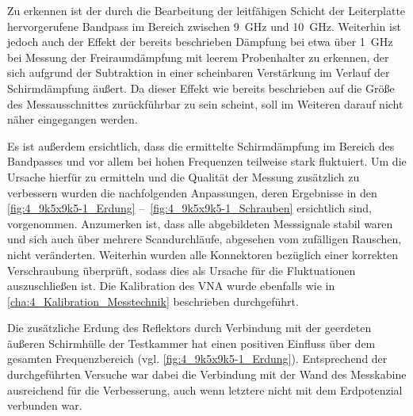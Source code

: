 Zu erkennen ist der durch die Bearbeitung der leitfähigen Schicht der Leiterplatte hervorgerufene Bandpass im Bereich zwischen \SI{9}{\giga\hertz} und \SI{10}{\giga\hertz}. Weiterhin ist jedoch auch der Effekt der bereits beschrieben Dämpfung bei etwa über \SI{1}{\giga\hertz} bei Messung der Freiraumdämpfung mit leerem Probenhalter zu erkennen, der sich aufgrund der Subtraktion in einer scheinbaren Verstärkung im Verlauf der Schirmdämpfung äußert. Da dieser Effekt wie bereits beschrieben auf die Größe des Messausschnittes zurückführbar zu sein scheint, soll im Weiteren darauf nicht näher eingegangen werden. 
\par
\vspace{\linespace}
Es ist außerdem ersichtlich, dass die ermittelte Schirmdämpfung im Bereich des Bandpasses und vor allem bei hohen Frequenzen teilweise stark fluktuiert. Um die Ursache hierfür zu ermitteln und die Qualität der Messung zusätzlich zu verbessern wurden die nachfolgenden Anpassungen, deren Ergebnisse in den \Abbildungen\ref{fig:4_9k5x9k5-1_Erdung} --~\ref{fig:4_9k5x9k5-1_Schrauben} ersichtlich sind, vorgenommen. Anzumerken ist, dass alle abgebildeten Messsignale stabil waren und sich auch über mehrere Scandurchläufe, abgesehen vom zufälligen Rauschen, nicht veränderten. Weiterhin wurden alle Konnektoren bezüglich einer korrekten Verschraubung überprüft, sodass dies als Ursache für die Fluktuationen auszuschließen ist. Die Kalibration des VNA wurde ebenfalls wie in \Abschnitt\ref{cha:4_Kalibration_Messtechnik} beschrieben durchgeführt. 
\par
\vspace{\linespace}
Die zusätzliche Erdung des Reflektors durch Verbindung mit der geerdeten äußeren Schirmhülle der Testkammer hat einen positiven Einfluss über dem gesamten Frequenzbereich (vgl. \Abb\ref{fig:4_9k5x9k5-1_Erdung}). Entsprechend der durchgeführten Versuche war dabei die Verbindung mit der Wand des Messkabine ausreichend für die Verbesserung, auch wenn letztere nicht mit dem Erdpotenzial verbunden war.  
\par
\vspace{\linespace}

